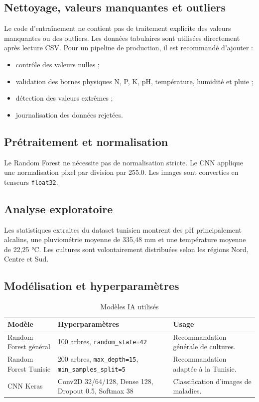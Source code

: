 \subsection{Nettoyage, valeurs manquantes et outliers}
Le code d'entraînement ne contient pas de traitement explicite des valeurs manquantes ou des outliers. Les données tabulaires sont utilisées directement après lecture CSV. Pour un pipeline de production, il est recommandé d'ajouter :
\begin{itemize}[noitemsep]
  \item contrôle des valeurs nulles ;
  \item validation des bornes physiques N, P, K, pH, température, humidité et pluie ;
  \item détection des valeurs extrêmes ;
  \item journalisation des données rejetées.
\end{itemize}

\subsection{Prétraitement et normalisation}
Le Random Forest ne nécessite pas de normalisation stricte. Le CNN applique une normalisation pixel par division par 255.0. Les images sont converties en tenseurs \texttt{float32}.

\subsection{Analyse exploratoire}
Les statistiques extraites du dataset tunisien montrent des pH principalement alcalins, une pluviométrie moyenne de 335,48 mm et une température moyenne de 22,25 °C. Les cultures sont volontairement distribuées selon les régions Nord, Centre et Sud.

\subsection{Modélisation et hyperparamètres}
\begin{longtable}{p{4cm}p{5cm}p{5cm}}
\caption{Modèles IA utilisés}\\
\toprule
\textbf{Modèle} & \textbf{Hyperparamètres} & \textbf{Usage} \\
\midrule
Random Forest général & 100 arbres, \texttt{random\_state=42} & Recommandation générale de cultures. \\
Random Forest Tunisie & 200 arbres, \texttt{max\_depth=15}, \texttt{min\_samples\_split=5} & Recommandation adaptée à la Tunisie. \\
CNN Keras & Conv2D 32/64/128, Dense 128, Dropout 0.5, Softmax 38 & Classification d'images de maladies. \\
\bottomrule
\end{longtable}

